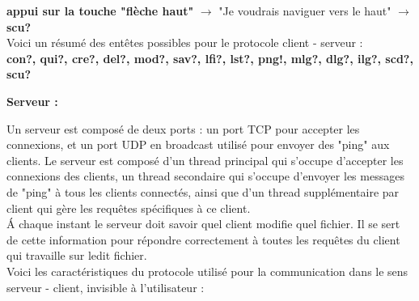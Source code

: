 \documentclass[12pt]{article}
\begin{document}
\textbf{appui sur la touche "flèche haut"} $\rightarrow$ "Je voudrais naviguer vers le haut" $\rightarrow$ \textbf{scu?}\\

Voici un résumé des entêtes possibles pour le protocole client - serveur :\\
\textbf{con?, qui?, cre?, del?, mod?, sav?, lfi?, lst?, png!, mlg?, dlg?, ilg?, scd?, scu?\\}

\textbf{Serveur :}

Un serveur est composé de deux ports : un port TCP pour accepter les connexions, et un port UDP en broadcast utilisé pour envoyer des "ping" aux clients. Le serveur est composé d'un thread principal qui s'occupe d'accepter les connexions des clients, un thread secondaire qui s'occupe d'envoyer les messages de "ping" à tous les clients connectés, ainsi que d'un thread supplémentaire par client qui gère les requêtes spécifiques à ce client.\\

\'A chaque instant le serveur doit savoir quel client modifie quel fichier. Il se sert de cette information pour répondre correctement à toutes les requêtes du client qui travaille sur ledit fichier.\\

Voici les caractéristiques du protocole utilisé pour la communication dans le sens serveur - client, invisible à l'utilisateur :\\
\end{document}
